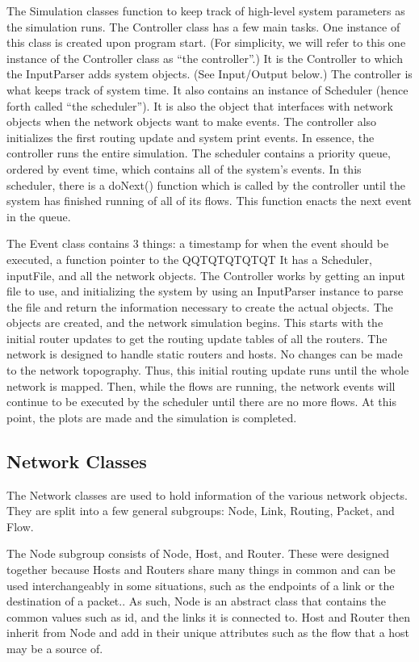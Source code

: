     The Simulation classes function to keep track of high-level system parameters as the simulation runs. 
The Controller class has a few main tasks. One instance of this class is created upon program start. (For simplicity, we will refer to this one instance of the Controller class as “the controller”.) It is the Controller to which the InputParser adds system objects. (See Input/Output below.) The controller is what keeps track of system time. It also contains an instance of Scheduler (hence forth called “the scheduler”). It is also the object that interfaces with network objects when the network objects want to make events. The controller also initializes the first routing update and system print events. In essence, the controller runs the entire simulation.
The scheduler contains a priority queue, ordered by event time, which contains all of the system’s events. In this scheduler, there is a doNext() function which is called by the controller until the system has finished running of all of its flows. This function enacts the next event in the queue. 

The Event class contains 3 things: a timestamp for when the event should be executed, a function pointer to the QQTQTQTQTQT
It has a Scheduler, inputFile, and all the network objects. The Controller works by getting an input file to use, and initializing the system by using an InputParser instance to parse the file and return the information necessary to create the actual objects. The objects are created, and the network simulation begins. This starts with the initial router updates to get the routing update tables of all the routers. The network is designed to handle static routers and hosts. No changes can be made to the network topography. Thus, this initial routing update runs until the whole network is mapped. Then, while the flows are running, the network events will continue to be executed by the scheduler until there are no more flows. At this point, the plots are made and the simulation is completed.

\subsection{Network Classes}
    The Network classes are used to hold information of the various network objects. They are split into a few general subgroups: Node, Link, Routing, Packet, and Flow.
    
The Node subgroup consists of Node, Host, and Router. These were designed together because Hosts and Routers share many things in common and can be used interchangeably in some situations, such as the endpoints of a link or the destination of a packet.. As such, Node is an abstract class that contains the common values such as id, and the links it is connected to. Host and Router then inherit from Node and add in their unique attributes such as the flow that a host may be a source of.

